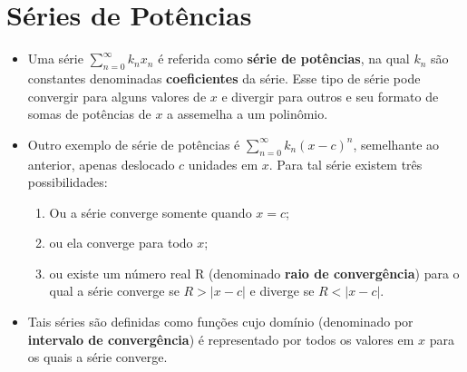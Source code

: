 	\section{Séries de Potências}
	
		\begin{itemize}
			
			\item Uma série $\sum_{n=0}^{\infty} k_{n}x_{n}$ é referida como \textbf{série de potências}, na qual $k_{n}$ são constantes denominadas \textbf{coeficientes} da série. Esse tipo de série pode convergir para alguns valores de $x$ e divergir para outros e seu formato de somas de potências de $x$ a assemelha a um polinômio.
			
			\item Outro exemplo de série de potências é $\sum_{n=0}^{\infty} k_{n}(x - c)^{n}$, semelhante ao anterior, apenas deslocado $c$ unidades em $x$. Para tal série existem três possibilidades:
			
			\begin{enumerate}
				
				\item Ou a série converge somente quando $x = c$;
				
				\item ou ela converge para todo $x$;
				
				\item ou existe um número real R (denominado \textbf{raio de convergência}) para o qual a série converge se $R > |x - c|$ e diverge se $R < |x - c|$.
				
			\end{enumerate}
			
			\item Tais séries são definidas como funções cujo domínio (denominado por \textbf{intervalo de convergência}) é representado por todos os valores em $x$ para os quais a série converge. 
			
		\end{itemize}
	
